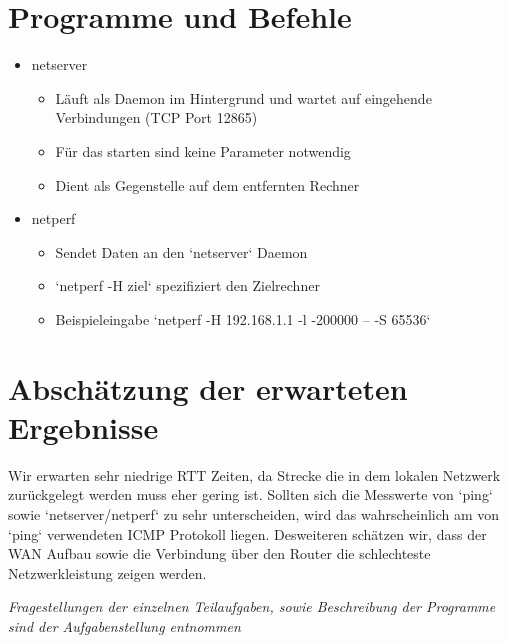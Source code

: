 \documentclass[a4paper,10pt]{article}
\begin{document}
\section{Programme und Befehle}
\begin{itemize}
 \item netserver
 \begin{itemize}
  \item L\"auft als Daemon im Hintergrund und wartet auf eingehende Verbindungen (TCP Port 12865)
  \item F\"ur das starten sind keine Parameter notwendig
  \item Dient als Gegenstelle auf dem entfernten Rechner
 \end{itemize}
 \item netperf
 \begin{itemize}
  \item Sendet Daten an den `netserver` Daemon
  \item `netperf -H ziel` spezifiziert den Zielrechner
  \item Beispieleingabe `netperf -H 192.168.1.1 -l -200000 -- -S 65536`
 \end{itemize}
\end{itemize}

\section{Absch\"atzung der erwarteten Ergebnisse}
Wir erwarten sehr niedrige RTT Zeiten, da Strecke die in dem lokalen Netzwerk zur\"uckgelegt
werden muss eher gering ist. Sollten sich die Messwerte von `ping` sowie `netserver/netperf` zu
sehr unterscheiden, wird das wahrscheinlich am von `ping` verwendeten ICMP Protokoll liegen.
Desweiteren sch\"atzen wir, dass der WAN Aufbau sowie die Verbindung \"uber den Router die schlechteste
Netzwerkleistung zeigen werden.
\newline

\textit{Fragestellungen der einzelnen Teilaufgaben,
sowie Beschreibung der Programme sind der Aufgabenstellung entnommen}
\end{document}
